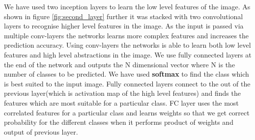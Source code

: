 \documentclass[fleqn,10pt]{SelfArx} %
\begin{document}
We have used two inception layers to learn the low level features of the image. As shown in figure \ref{fig:second_layer} further it was stacked with two convolutional layers to recognise higher level features in the image. As the input is passed via multiple conv-layers the networks learns more complex features and increases the prediction accuracy. 
\newline
Using conv-layers the networks is able to learn both low level features and high level abstractions in the image. We use fully connected layers at the end of the network and outputs the N dimensional vector where N is the number of classes to be predicted. We have used \textbf{softmax} to find the class which is best suited to the input image. Fully connected layers connect to the out of the previous layer(which is activation map of the high level features) and finds the features which are most suitable for a particular class. FC layer uses the most correlated features for a particular class and learns weights so that we get correct probability for the different classes when it performs product of weights and output of previous layer.
\end{document}
